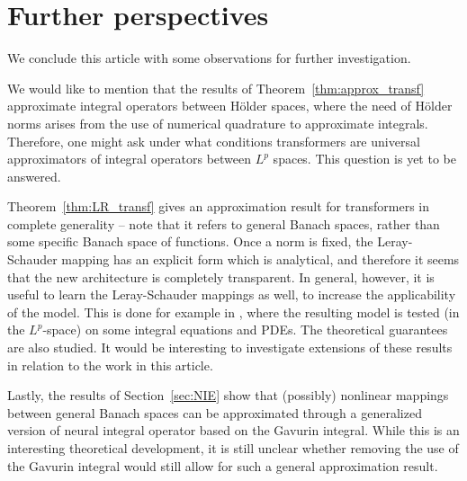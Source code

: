 \documentclass[a4paper,12pt,reqno]{amsart}
\theoremstyle{definition}
\theoremstyle{remark}
\begin{document}
\section{Further perspectives}\label{sec:fp}

We conclude this article with some observations for further investigation. 

We would like to mention that the results of Theorem~\ref{thm:approx_transf} approximate integral operators between H\"older spaces, where the need of H\"older norms arises from the use of numerical quadrature to approximate integrals. Therefore, one might ask under what conditions transformers are universal approximators of integral operators between $L^p$ spaces. This question is yet to be answered. 

Theorem~\ref{thm:LR_transf} gives an approximation result for transformers in complete generality -- note that it refers to general Banach spaces, rather than some specific Banach space of functions. Once a norm is fixed, the Leray-Schauder mapping has an explicit form which is analytical, and therefore it seems that the new architecture is completely transparent. In general, however, it is useful to learn the Leray-Schauder mappings as well, to increase the applicability of the model. This is done for example in \cite{zappala2024leray}, where the resulting model is tested (in the $L^p$-space) on some integral equations and PDEs. The theoretical guarantees are also studied. It would be interesting to investigate extensions of these results in relation to the work in this article. 

Lastly, the results of Section~\ref{sec:NIE} show that (possibly) nonlinear mappings between general Banach spaces can be approximated through a generalized version of neural integral operator based on the Gavurin integral. While this is an interesting theoretical development, it is still unclear whether removing the use of the Gavurin integral would still allow for such a general approximation result. 






\end{document}
